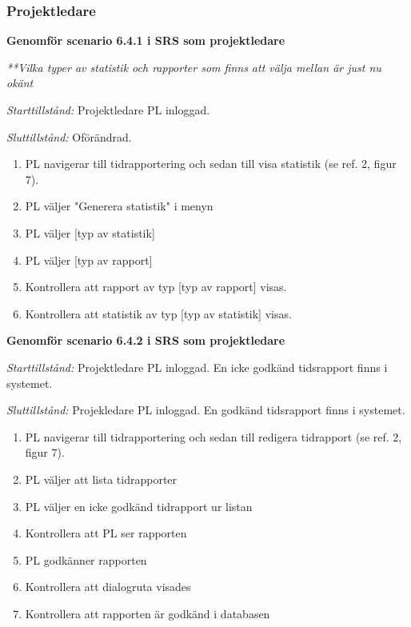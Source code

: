 \documentclass[a4paper]{article}
\begin{document}
\subsubsection{Projektledare}
\begin{ST}

\item
\textbf{Genomför scenario 6.4.1 i SRS som projektledare}

\emph{**Vilka typer av statistik och rapporter som finns att välja mellan är just nu okänt}

\emph{Starttillstånd:} Projektledare PL inloggad.

\emph{Sluttillstånd:} Oförändrad.

\begin{enumerate}
\item
PL navigerar till tidrapportering och sedan till visa statistik (se ref. 2, figur 7).
\item 
PL väljer "Generera statistik" i menyn
\item
PL väljer [typ av statistik]
\item 
PL väljer [typ av rapport]
\item
Kontrollera att rapport av typ [typ av rapport] visas.
\item
Kontrollera att statistik av typ [typ av statistik] visas.
\end{enumerate}

\item
\textbf{Genomför scenario 6.4.2 i SRS som projektledare}

\emph{Starttillstånd:} Projektledare PL inloggad. En icke godkänd tidsrapport finns i systemet.

\emph{Sluttillstånd:} Projekledare PL inloggad. En godkänd tidsrapport finns i systemet.

\begin{enumerate}
\item
PL navigerar till tidrapportering och sedan till redigera tidrapport (se ref. 2, figur 7).
\item
PL väljer att lista tidrapporter
\item
PL väljer en icke godkänd tidrapport ur listan
\item
Kontrollera att PL ser rapporten
\item
PL godkänner rapporten
\item
Kontrollera att dialogruta visades
\item
Kontrollera att rapporten är godkänd i databasen

\end{enumerate}


\end{ST}
\end{document}
